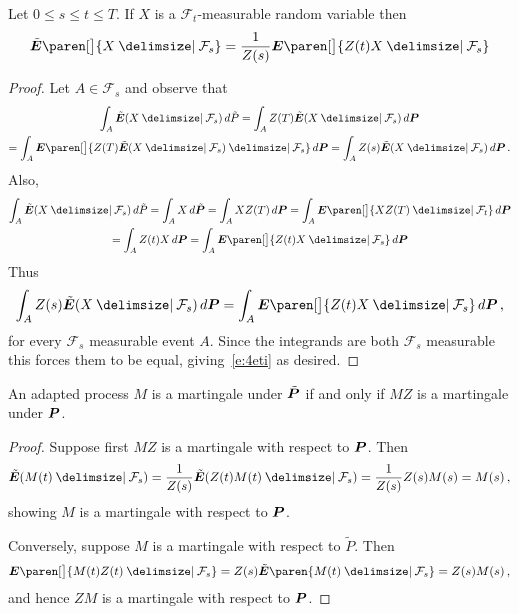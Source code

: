 \begin{lemma}
  Let $0 \leq s \leq t \leq T$.
  If $X$ is a $\mathcal F_t$-measurable random variable then
  \begin{equation}\label{e:4eti}
    \tilde\E\paren[\big]{ X \given \mathcal F_s }
      = \frac{1}{Z(s)} \E \paren[\big]{ Z(t) X \given \mathcal F_s }
  \end{equation}
\end{lemma}
\begin{proof}
  Let $A \in \mathcal F_s$ and observe that
  \begin{multline*}
    \int_A \tilde\E( X \given \mathcal F_s ) \, d\tilde P
      = \int_A Z(T) \tilde\E( X \given \mathcal F_s ) \, d\P
    \\
      = \int_A \E\paren[\big]{
	  Z(T) \tilde\E( X \given \mathcal F_s ) \given \mathcal F_s} \, d\P
      = \int_A Z(s) \tilde\E( X \given \mathcal F_s )\, d\P\,.
  \end{multline*}
  Also,
  \begin{multline*}
    \int_A \tilde\E( X \given \mathcal F_s ) \, d\tilde P
      = \int_A X \, d\tilde \P
      = \int_A X Z(T) \, d\P
      = \int_A \E\paren[\big]{ X Z(T) \given \mathcal F_t } \, d\P
  \\
      = \int_A Z(t) X \, d\P
      = \int_A \E\paren[\big]{ Z(t) X \given \mathcal F_s} \, d\P
  \end{multline*}
  Thus 
  \begin{equation*}
    \int_A Z(s) \tilde\E( X \given \mathcal F_s )\, d\P
      = \int_A \E\paren[\big]{ Z(t) X \given \mathcal F_s} \, d\P\,,
  \end{equation*}
  for every $\mathcal F_s$ measurable event $A$.
  Since the integrands are both $\mathcal F_s$ measurable this forces them to be equal, giving~\eqref{e:4eti} as desired.
\end{proof}

\begin{lemma}\label{l:4pmg}
  An adapted process $M$ is a martingale under $\tilde\P$ if and only if $MZ$ is a martingale under $\P$.
\end{lemma}
\begin{proof}
  Suppose first $MZ$ is a martingale with respect to $\P$.
  Then
  \begin{equation*}
    \tilde\E( M(t) \given \mathcal F_s )
      = \frac{1}{Z(s)} \tilde\E( Z(t) M(t) \given \mathcal F_s )
      = \frac{1}{Z(s)} Z(s) M(s) = M(s)\,,
  \end{equation*}
  showing $M$ is a martingale with respect to $\P$.

  Conversely, suppose $M$ is a martingale with respect to $\tilde P$.
  Then
  \begin{equation*}
    \E\paren[\big]{ M(t) Z(t) \given \mathcal F_s }
      = Z(s) \tilde\E\paren{ M(t) \given \mathcal F_s }
      = Z(s) M(s)\,,
  \end{equation*}
  and hence $ZM$ is a martingale with respect to $\P$.
\end{proof}

